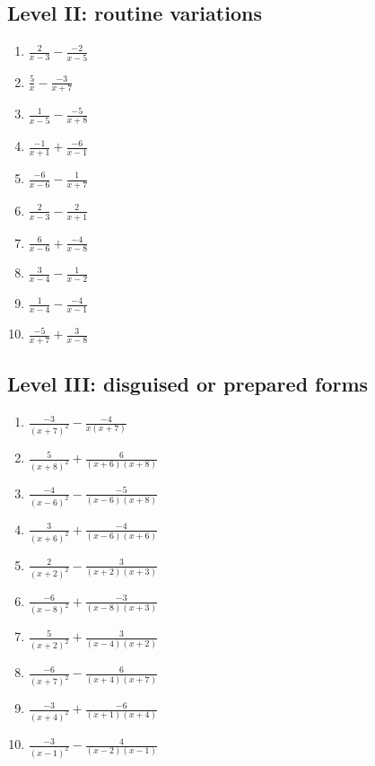 \documentclass[11pt,oneside]{book}
\begin{document}
\subsection*{Level II: routine variations}
\begin{enumerate}[leftmargin=*,label=\textbf{\arabic*.},itemsep=0.65\baselineskip]
\item $\displaystyle \frac{2}{x - 3}-\frac{-2}{x - 5}$
\item $\displaystyle \frac{5}{x}-\frac{-3}{x + 7}$
\item $\displaystyle \frac{1}{x - 5}-\frac{-5}{x + 8}$
\item $\displaystyle \frac{-1}{x + 1}+\frac{-6}{x - 1}$
\item $\displaystyle \frac{-6}{x - 6}-\frac{1}{x + 7}$
\item $\displaystyle \frac{2}{x - 3}-\frac{2}{x + 1}$
\item $\displaystyle \frac{6}{x - 6}+\frac{-4}{x - 8}$
\item $\displaystyle \frac{3}{x - 4}-\frac{1}{x - 2}$
\item $\displaystyle \frac{1}{x - 4}-\frac{-4}{x - 1}$
\item $\displaystyle \frac{-5}{x + 7}+\frac{3}{x - 8}$
\end{enumerate}
\subsection*{Level III: disguised or prepared forms}
\begin{enumerate}[leftmargin=*,label=\textbf{\arabic*.},itemsep=0.65\baselineskip]
\item $\displaystyle \frac{-3}{\left(x + 7\right)^{2}}-\frac{-4}{x \left(x + 7\right)}$
\item $\displaystyle \frac{5}{\left(x + 8\right)^{2}}+\frac{6}{\left(x + 6\right) \left(x + 8\right)}$
\item $\displaystyle \frac{-4}{\left(x - 6\right)^{2}}-\frac{-5}{\left(x - 6\right) \left(x + 8\right)}$
\item $\displaystyle \frac{3}{\left(x + 6\right)^{2}}+\frac{-4}{\left(x - 6\right) \left(x + 6\right)}$
\item $\displaystyle \frac{2}{\left(x + 2\right)^{2}}-\frac{3}{\left(x + 2\right) \left(x + 3\right)}$
\item $\displaystyle \frac{-6}{\left(x - 8\right)^{2}}+\frac{-3}{\left(x - 8\right) \left(x + 3\right)}$
\item $\displaystyle \frac{5}{\left(x + 2\right)^{2}}+\frac{3}{\left(x - 4\right) \left(x + 2\right)}$
\item $\displaystyle \frac{-6}{\left(x + 7\right)^{2}}-\frac{6}{\left(x + 4\right) \left(x + 7\right)}$
\item $\displaystyle \frac{-3}{\left(x + 4\right)^{2}}+\frac{-6}{\left(x + 1\right) \left(x + 4\right)}$
\item $\displaystyle \frac{-3}{\left(x - 1\right)^{2}}-\frac{4}{\left(x - 2\right) \left(x - 1\right)}$
\end{enumerate}
\end{document}
